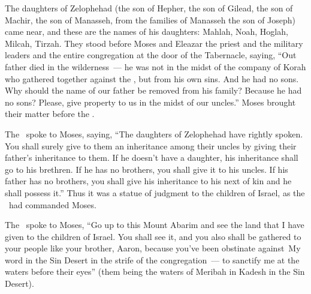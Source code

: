 
\begin{inparaenum}
   The daughters of Zelophehad (the son of Hepher, the son of Gilead, the son of Machir, the son of Manasseh, from the families of Manasseh the son of Joseph) came near, and these are the names of his daughters: Mahlah, Noah, Hoglah, Milcah, Tirzah.%
   They stood before Moses and Eleazar the priest and the military leaders and the entire congregation at the door of the Tabernacle, saying,%
   ``Out father died in the wilderness~--- he was not in the midst of the company of Korah who gathered together against the \lord, but from his own sins. And he had no sons.%
   Why should the name of our father be removed from his family? Because he had no sons? Please, give property to us in the midst of our uncles.''%
   Moses brought their matter before the \lord.%

   The \lord\ spoke to Moses, saying,%
   ``The daughters of Zelophehad have rightly spoken. You shall surely give to them an inheritance among their uncles by giving their father's inheritance to them.%
   If he doesn't have a daughter, his inheritance shall go to his brethren.%
   If he has no brothers, you shall give it to his uncles.%
   If his father has no brothers, you shall give his inheritance to his next of kin and he shall possess it.'' Thus it was a statue of judgment to the children of Israel, as the \lord\ had commanded Moses.%

   The \lord\ spoke to Moses, ``Go up to this Mount Abarim and see the land that I have given to the children of Israel.%
   You shall see it, and you also shall be gathered to your people like your brother, Aaron,%
   because you've been obstinate against\understood{}\ My word in the Sin Desert in the strife of the congregation~--- to sanctify me at the waters before their eyes'' (them being the waters of Meribah in Kadesh in the Sin Desert).%


\end{inparaenum}
